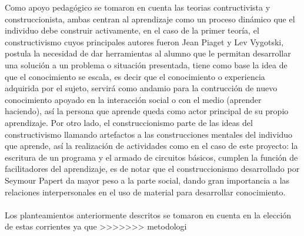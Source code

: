 \documentclass[letterpaper,10pt]{article}
\begin{document}
Como apoyo pedagógico se tomaron en cuenta las teorias contructivista y
construccionista, ambas centran al aprendizaje como un  proceso dinámico que el individuo
debe construir activamente, en el caso de la primer teoría, el constructivismo
cuyos principales autores fueron Jean Piaget y Lev Vygotski, postula la
necesidad de dar herramientas al alumno  que le permitan desarrollar
una solución a un problema o situación presentada, tiene como base la idea de
que el conocimiento se escala, es decir que el conocimiento o experiencia
adquirida por el sujeto, servirá como andamio para la contrucción de nuevo
conocimiento apoyado en la interacción social o con el medio (aprender haciendo), 
así la persona que aprende queda como actor principal de su propio
aprendizaje. Por otro lado, el construccionismo parte de las ideas del
constructivismo llamando artefactos a las construcciones mentales del individuo
que aprende, así la realización de  actividades como en el caso de
este proyecto: la escritura de un programa y el armado de circuitos básicos,
cumplen la función de facilitadores del aprendizaje, es de notar que el
construccionismo desarrollado por Seymour Papert  da mayor peso a la parte social, dando gran importancia a
las relaciones interpersonales en el uso de material para desarrollar
conocimiento.\\\\
Los planteamientos anteriormente descritos se  tomaron en cuenta en la elección de estas
corrientes ya que  
>>>>>>> metodologi
\end{document}

